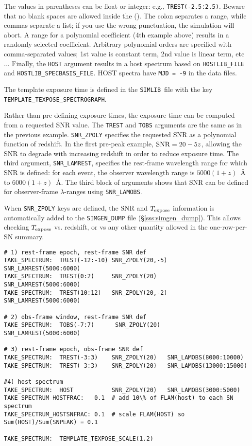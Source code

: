 \documentclass[12pt]{article}
\newcommand{\Texpose}{T_{\rm expose}}
\newcommand{\simlib}{{\tt SIMLIB}}
\begin{document}
The values in parentheses can be float or integer: 
e.g., {\tt TREST(-2.5:2.5)}. Beware that no blank
spaces are allowed inside the (). The colon separates
a range, while commas separate a list; if you use the
wrong punctuation, the simulation will abort.
A range for a polynomial coefficient (4th example above)
results in a randomly selected coefficient. 
Arbitrary polynomial orders are specified with comma-separated values;
1st value is constant term, 2nd value is linear term, etc ...
Finally, the {\tt HOST} argument results in a host spectrum
based on {\tt HOSTLIB\_FILE} and {\tt HOSTLIB\_SPECBASIS\_FILE}.
HOST spectra have {\tt MJD = -9} in the data files.


The template exposure time is defined in the \simlib\ file
with the key \\ {\tt TEMPLATE\_TEXPOSE\_SPECTROGRAPH}.

\medskip
\noindent Rather than pre-defining exposure times, the exposure
time can be computed from a requested SNR value.
The {\tt TREST} and {\tt TOBS} arguments are the same as in 
the previous example.
{\tt SNR\_ZPOLY} specifies the requested SNR as a 
polynomial function of redshift. In the first pre-peak
example, ${\rm SNR} = 20-5z$, allowing the SNR to degrade
with increasing redshift in order to reduce exposure time.
The third argument, {\tt SNR\_LAMREST}, specifies the
rest-frame wavelength range for which SNR is defined:
for each event, the observer wavelength range is
$5000(1+z)$~{\AA} to $6000(1+z)$~{\AA}.
The third block of arguments shows that SNR can be
defined for observer-frame $\lambda$-ranges using
{\tt SNR\_LAMOBS}.

When {\tt SNR\_ZPOLY} keys are defined, the SNR and $\Texpose$
information is automatically added to the {\tt SIMGEN\_DUMP}
file (\S\ref{sss:simgen_dump}).
This allows checking $\Texpose$ vs. redshift, or vs
any other quantity allowed in the one-row-per-SN summary.

\begin{Verbatim}[frame=single]
# 1) rest-frame epoch, rest-frame SNR def
TAKE_SPECTRUM:  TREST(-12:-10) SNR_ZPOLY(20,-5)  SNR_LAMREST(5000:6000)
TAKE_SPECTRUM:  TREST(0:2)     SNR_ZPOLY(20)     SNR_LAMREST(5000:6000)
TAKE_SPECTRUM:  TREST(10:12)   SNR_ZPOLY(20,-2)  SNR_LAMREST(5000:6000)

# 2) obs-frame window, rest-frame SNR def
TAKE_SPECTRUM:  TOBS(-7:7)      SNR_ZPOLY(20)    SNR_LAMREST(5000:6000)

# 3) rest-frame epoch, obs-frame SNR def
TAKE_SPECTRUM:  TREST(-3:3)    SNR_ZPOLY(20)   SNR_LAMOBS(8000:10000)
TAKE_SPECTRUM:  TREST(-3:3)    SNR_ZPOLY(20)   SNR_LAMOBS(13000:15000)

#4) host spectrum 
TAKE_SPECTRUM:  HOST           SNR_ZPOLY(20)   SNR_LAMOBS(3000:5000)
TAKE_SPECTRUM_HOSTFRAC:   0.1  # add 10\% of FLAM(host) to each SN spectrum
TAKE_SPECTRUM_HOSTSNFRAC: 0.1  # scale FLAM(HOST) so Sum(HOST)/Sum(SNPEAK) = 0.1

TAKE_SPECTRUM:  TEMPLATE_TEXPOSE_SCALE(1.2)
\end{Verbatim}
\end{document}
